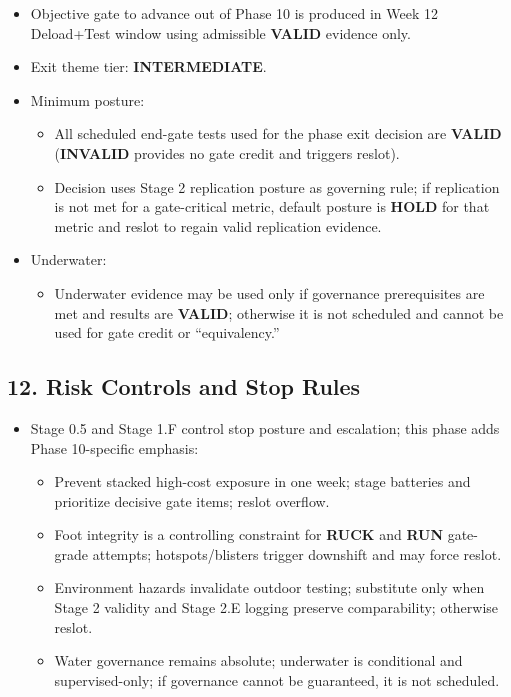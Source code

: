 \documentclass[10pt]{article}
\begin{document}
\begin{itemize}
\item Objective gate to advance out of Phase 10 is produced in Week 12 Deload+Test window using admissible \textbf{VALID} evidence only.
\item Exit theme tier: \textbf{INTERMEDIATE}.
\item Minimum posture:
  \begin{itemize}
  \item All scheduled end-gate tests used for the phase exit decision are \textbf{VALID} (\textbf{INVALID} provides no gate credit and triggers reslot).
  \item Decision uses Stage 2 replication posture as governing rule; if replication is not met for a gate-critical metric, default posture is \textbf{HOLD} for that metric and reslot to regain valid replication evidence.
  \end{itemize}
\item Underwater:
  \begin{itemize}
  \item Underwater evidence may be used only if governance prerequisites are met and results are \textbf{VALID}; otherwise it is not scheduled and cannot be used for gate credit or “equivalency.”
  \end{itemize}
\end{itemize}

\subsection*{12. Risk Controls and Stop Rules}

\begin{itemize}
\item Stage 0.5 and Stage 1.F control stop posture and escalation; this phase adds Phase 10-specific emphasis:
  \begin{itemize}
  \item Prevent stacked high-cost exposure in one week; stage batteries and prioritize decisive gate items; reslot overflow.
  \item Foot integrity is a controlling constraint for \textbf{RUCK} and \textbf{RUN} gate-grade attempts; hotspots/blisters trigger downshift and may force reslot.
  \item Environment hazards invalidate outdoor testing; substitute only when Stage 2 validity and Stage 2.E logging preserve comparability; otherwise reslot.
  \item Water governance remains absolute; underwater is conditional and supervised-only; if governance cannot be guaranteed, it is not scheduled.
  \end{itemize}
\end{itemize}
\end{document}
